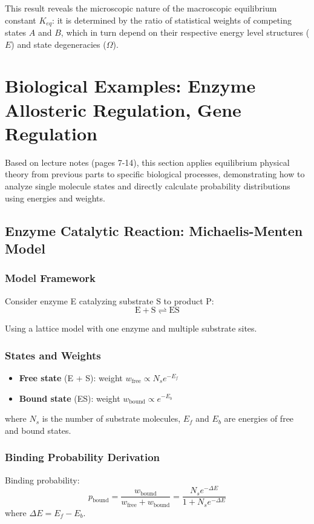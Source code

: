 \documentclass[12pt]{article}
\begin{document}
This result reveals the microscopic nature of the macroscopic equilibrium constant $K_{eq}$: it is determined by the ratio of statistical weights of competing states $A$ and $B$, which in turn depend on their respective energy level structures ($E$) and state degeneracies ($\Omega$).

\section{Biological Examples: Enzyme Allosteric Regulation, Gene Regulation}

Based on lecture notes (pages 7-14), this section applies equilibrium physical theory from previous parts to specific biological processes, demonstrating how to analyze single molecule states and directly calculate probability distributions using energies and weights.

\subsection{Enzyme Catalytic Reaction: Michaelis-Menten Model}

\subsubsection{Model Framework}
Consider enzyme E catalyzing substrate S to product P:
\begin{equation}
\mathrm{E} + \mathrm{S} \rightleftharpoons \mathrm{ES}
\end{equation}

Using a lattice model with one enzyme and multiple substrate sites.

\subsubsection{States and Weights}
\begin{itemize}
    \item \textbf{Free state} (E + S): weight $w_{\text{free}} \propto N_s e^{-E_f}$
    \item \textbf{Bound state} (ES): weight $w_{\text{bound}} \propto e^{-E_b}$
\end{itemize}
where $N_s$ is the number of substrate molecules, $E_f$ and $E_b$ are energies of free and bound states.

\subsubsection{Binding Probability Derivation}
Binding probability:
\begin{equation}
p_{\text{bound}} = \frac{w_{\text{bound}}}{w_{\text{free}} + w_{\text{bound}}} = \frac{N_s e^{-\Delta E}}{1 + N_s e^{-\Delta E}}
\end{equation}
where $\Delta E = E_f - E_b$.
\end{document}
